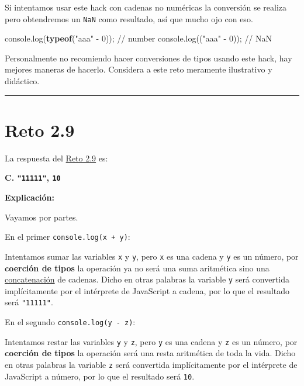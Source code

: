 \documentclass[
  letterpaper,
  DIV=11,
  numbers=noendperiod]{scrreprt}
\newenvironment{Shaded}{\begin{snugshade}}{\end{snugshade}}
\newcommand{\BuiltInTok}[1]{\textcolor[rgb]{0.00,0.23,0.31}{#1}}
\newcommand{\CommentTok}[1]{\textcolor[rgb]{0.37,0.37,0.37}{#1}}
\newcommand{\DecValTok}[1]{\textcolor[rgb]{0.68,0.00,0.00}{#1}}
\newcommand{\FunctionTok}[1]{\textcolor[rgb]{0.28,0.35,0.67}{#1}}
\newcommand{\KeywordTok}[1]{\textcolor[rgb]{0.00,0.23,0.31}{\textbf{#1}}}
\newcommand{\NormalTok}[1]{\textcolor[rgb]{0.00,0.23,0.31}{#1}}
\newcommand{\OperatorTok}[1]{\textcolor[rgb]{0.37,0.37,0.37}{#1}}
\newcommand{\StringTok}[1]{\textcolor[rgb]{0.13,0.47,0.30}{#1}}
\begin{document}
Si intentamos usar este hack con cadenas no numéricas la conversión se
realiza pero obtendremos un \texttt{NaN} como resultado, así que mucho
ojo con eso.

\begin{Shaded}
\begin{Highlighting}[]
\BuiltInTok{console}\OperatorTok{.}\FunctionTok{log}\NormalTok{(}\KeywordTok{typeof}\NormalTok{(}\StringTok{"aaa"} \OperatorTok{{-}} \DecValTok{0}\NormalTok{))}\OperatorTok{;} \CommentTok{// number}
\BuiltInTok{console}\OperatorTok{.}\FunctionTok{log}\NormalTok{((}\StringTok{"aaa"} \OperatorTok{{-}} \DecValTok{0}\NormalTok{))}\OperatorTok{;} \CommentTok{// NaN}
\end{Highlighting}
\end{Shaded}

Personalmente no recomiendo hacer conversiones de tipos usando este
hack, hay mejores maneras de hacerlo. Considera a este reto meramente
ilustrativo y didáctico.

\begin{center}\rule{0.5\linewidth}{0.5pt}\end{center}

\section{Reto 2.9}\label{sec-sol-cap2-reto9}

La respuesta del \hyperref[sec-cap2-reto9]{Reto 2.9} es:

\textbf{C. \texttt{"11111"}, \texttt{10}}

\textbf{Explicación:}

Vayamos por partes.

En el primer \texttt{console.log(x\ +\ y)}:

Intentamos sumar las variables \texttt{x} y \texttt{y}, pero \texttt{x}
es una cadena y \texttt{y} es un número, por \textbf{coerción de tipos}
la operación ya no será una suma aritmética sino una
\hyperref[glos-concatenacion]{concatenación} de cadenas. Dicho en otras
palabras la variable \texttt{y} será convertida implícitamente por el
intérprete de JavaScript a cadena, por lo que el resultado será
\texttt{"11111"}.

En el segundo \texttt{console.log(y\ -\ z)}:

Intentamos restar las variables \texttt{y} y \texttt{z}, pero \texttt{y}
es una cadena y \texttt{z} es un número, por \textbf{coerción de tipos}
la operación será una resta aritmética de toda la vida. Dicho en otras
palabras la variable \texttt{z} será convertida implícitamente por el
intérprete de JavaScript a número, por lo que el resultado será
\texttt{10}.
\end{document}
